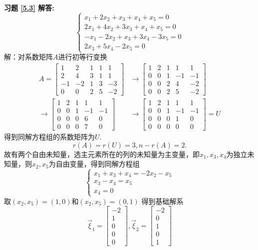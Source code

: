 \textbf{习题 \ref{5.3} 解答:}\\
\begin{equation*}
\begin{cases}
x_1+2x_2+ x_3+x_4+ x_5=0\\
2x_1+4x_2+3x_3+x_4+ x_5=0\\
-x_1-2x_2+ x_3+3x_4-3x_5=0\\
2x_3+5x_4-2x_5=0
\end{cases}
\end{equation*}
解：对系数矩阵$A$进行初等行变换
\begin{align*}
A= \begin{bmatrix}1&2&1&1&1\\2&4&3&1&1\\-1&-2&1&3&-3\\0&0&2&5&-2\end{bmatrix} &
   \rightarrow
   \begin{bmatrix}1&2&1&1&1\\0&0&1&-1&-1\\0&0&2&4&-2\\0&0&2&5&-2\end{bmatrix} \\
   \rightarrow
   \begin{bmatrix}1&2&1&1&1\\0&0&1&-1&-1\\0&0&0&6&0\\0&0&0&7&0\end{bmatrix} &
   \rightarrow
   \begin{bmatrix}1&2&1&1&1\\0&0&1&-1&-1\\0&0&0&1&0\\0&0&0&0&0\end{bmatrix}=U
\end{align*}
得到同解方程组的系数矩阵为$U$.
\begin{equation*}
  r(A)=r(U)=3,n-r(A)=2.
\end{equation*}
故有两个自由未知量，选主元素所在的列的未知量为主变量，即$x_1,x_3,x_4$为独立未知量，则$x_2,x_5$为自由变量，得到同解方程组
\begin{equation*}
\begin{cases}
x_1+x_3+x_4=-2x_2-x_5\\
   x_3-x_4=x_5       \\
   x_4=0
\end{cases}
\end{equation*}
取$(x_2,x_5)=(1,0)$和$(x_2,x_5)=(0,1)$ 得到基础解系
\begin{equation*}
\vec{\xi}_1=\begin{bmatrix}-2\\1\\0\\0\\0\end{bmatrix},
\vec{\xi}_2=\begin{bmatrix}-2\\0\\1\\0\\1\end{bmatrix}
\end{equation*}
